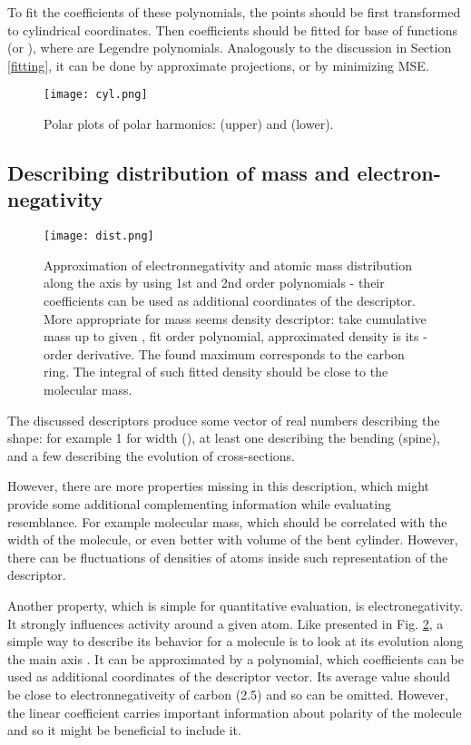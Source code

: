 \documentclass[10pt,journal]{IEEEtranTCOM}
\theoremstyle{plain}
\begin{document}
To fit the coefficients of these polynomials, the points should be first transformed to  cylindrical coordinates. Then coefficients should be fitted for  base of functions (or ), where  are Legendre polynomials. Analogously to the discussion in Section \ref{fitting}, it can be done by approximate projections, or by minimizing MSE.

\begin{figure}[t!]
    \centering
        \texttt{[image: cyl.png]}
        \caption{Polar plots of polar harmonics:  (upper) and  (lower).}
        \label{cyl}
\end{figure}
\subsection{Describing distribution of mass and electron-negativity}
\begin{figure}[t!]
    \centering
        \texttt{[image: dist.png]}
        \caption{Approximation of electronnegativity and atomic mass distribution along the  axis by using 1st and 2nd order polynomials - their coefficients can be used as additional coordinates of the descriptor. More appropriate for mass seems density descriptor: take cumulative mass up to given , fit  order polynomial, approximated density is its -order derivative. The found maximum corresponds to the carbon ring. The integral of such fitted density should be close to the molecular mass.}
        \label{dist}
\end{figure}
The discussed descriptors produce some vector of real numbers describing the shape: for example 1 for width (), at least one describing the bending (spine), and a few describing the evolution of cross-sections.

However, there are more properties missing in this description, which might provide some additional complementing information while evaluating resemblance. For example molecular mass, which should be correlated with the width of the molecule, or even better with volume of the bent cylinder. However, there can be fluctuations of densities of atoms inside such representation of the descriptor.

Another property, which is simple for quantitative evaluation, is electronegativity. It strongly influences activity around a given atom. Like presented in Fig. \ref{dist}, a simple way to describe its behavior for a molecule is to look at its evolution along the main axis . It can be approximated by a polynomial, which coefficients can be used as additional coordinates of the descriptor vector. Its average value should be close to electronnegativeity of carbon (2.5) and so can be omitted. However, the linear coefficient carries important information about polarity of the molecule and so it might be beneficial to include it.
\end{document}
